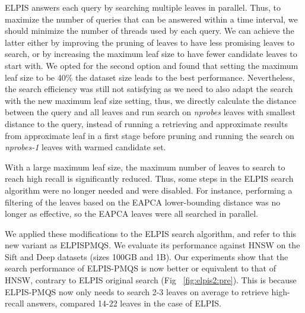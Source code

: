  ELPIS answers each query by searching multiple leaves in parallel. Thus, to maximize the number of queries that can be answered within a time interval, we should minimize the number of threads used by each query. 
We can achieve the latter either by improving the pruning of leaves to have less promising leaves to search, or by increasing the maximum leaf size to have fewer candidate leaves to start with. We opted for the second option and found that setting the maximum leaf size to be 40\% the dataset size leads to the best performance. Nevertheless, the search efficiency was still not satisfying as we need to also adapt the search with the new maximum leaf size setting, thus, we directly calculate the distance between the query and all leaves and run search on \textit{nprobes} leaves with smallest distance to the query, instead of running a retrieving and approximate results from approximate leaf in a first stage before pruning and running the search on \textit{nprobes-1} leaves with warmed candidate set.

 With a large maximum leaf size, the maximum number of leaves to search to reach high recall is significantly reduced. Thus, some steps in the ELPIS search algorithm were no longer needed and were disabled. For instance, performing a filtering of the leaves based on the EAPCA lower-bounding distance was no longer as effective, so the EAPCA leaves were all searched in parallel.

We applied these modifications to the ELPIS search algorithm, and refer to this new variant as ELPISPMQS.
We evaluate its performance against HNSW on the Sift and Deep datasets (sizes 100GB and 1B). Our experiments show that the search performance of ELPIS-PMQS is now better or equivalent to that of HNSW, contrary to ELPIS original search (Fig ~\ref{fig:elpis2:pre}). This is because ELPIS-PMQS now only needs to search 2-3 leaves on average to retrieve high-recall answers, compared 14-22 leaves in the case of ELPIS.




